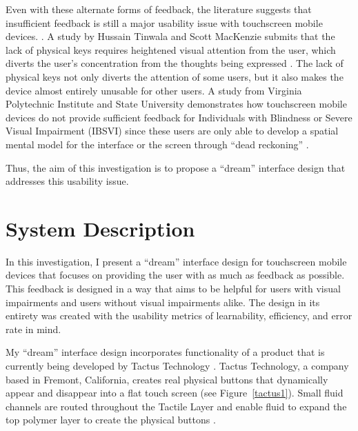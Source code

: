 \documentclass[11pt]{article}
\begin{document}
Even with these alternate forms of feedback, the literature suggests that insufficient feedback is still a major usability issue with touchscreen mobile devices. \cite{Tinwala:2010:ETE:18	68914.1868972, Kane:2011:UGB:1978942.1979001, Hardy:2008:TIT:1409240.1409267, El-Glaly:2013:TTF:2460625.2460665, Buxton:1986:HID:22339.22386}. A study by Hussain Tinwala and Scott MacKenzie submits that the lack of physical keys requires heightened visual attention from the user, which diverts the user's concentration from the thoughts being expressed \cite{Tinwala:2010:ETE:18 68914.1868972}. The lack of physical keys not only diverts the attention of some users, but it also makes the device  almost entirely unusable for other users. A study from Virginia Polytechnic Institute and State University demonstrates how touchscreen mobile devices do not provide sufficient feedback for Individuals with Blindness or Severe Visual Impairment (IBSVI) since these users are only able to develop a spatial mental model for the interface or the screen through ``dead reckoning'' \cite{El-Glaly:2013:TTF:2460625.2460665}. 

Thus, the aim of this investigation is to propose a ``dream'' interface design that addresses this usability issue.


\section{System Description}
\label{System Description}

In this investigation, I present a ``dream'' interface design for touchscreen mobile devices that focuses on providing the user with as much as feedback as possible. This feedback is designed in a way that aims to be helpful for users with visual impairments and users without visual impairments alike. The design in its entirety was created with the usability metrics of learnability, efficiency, and error rate in mind.

My ``dream'' interface design incorporates functionality of a product that is currently being developed by Tactus Technology \cite{Tactus}. Tactus Technology, a company based in Fremont, California, creates real physical buttons that dynamically appear and disappear into a flat touch screen (see Figure~\ref{tactus1}). Small fluid channels are routed throughout the Tactile Layer and enable fluid to expand the top polymer layer to create the physical buttons \cite{Tactus}.
\end{document}
